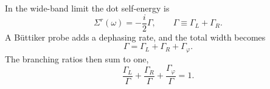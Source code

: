 \documentclass{article}
\begin{document}
In the wide-band limit the dot self-energy is
\begin{equation}
\Sigma^r(\omega) = -\frac{i}{2}\Gamma, \qquad \Gamma \equiv \Gamma_L + \Gamma_R .
\label{eq:se}
\end{equation}
A B\"uttiker probe adds a dephasing rate, and the total width becomes
\begin{equation}
\Gamma = \Gamma_L + \Gamma_R + \Gamma_\varphi .
\label{eq:total}
\end{equation}
The branching ratios then sum to one,
\begin{equation}
\frac{\Gamma_L}{\Gamma} + \frac{\Gamma_R}{\Gamma} + \frac{\Gamma_\varphi}{\Gamma} = 1 .
\label{eq:branch}
\end{equation}
\end{document}
